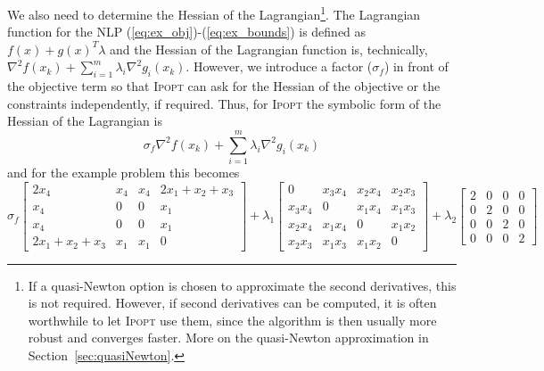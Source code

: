 \documentclass[10pt]{article}
\newcommand{\Ipopt}{\textsc{Ipopt}\xspace}
\begin{document}
We also need to determine the Hessian of the Lagrangian\footnote{If a
  quasi-Newton option is chosen to approximate the second derivatives,
  this is not required.  However, if second derivatives can be
  computed, it is often worthwhile to let \Ipopt use them, since the
  algorithm is then usually more robust and converges faster.  More on
  the quasi-Newton approximation in Section~\ref{sec:quasiNewton}.}.
The Lagrangian function for the NLP
(\ref{eq:ex_obj})-(\ref{eq:ex_bounds}) is defined as $f(x) + g(x)^T
\lambda$ and the Hessian of the Lagrangian function is, technically, $
\nabla^2 f(x_k) + \sum_{i=1}^m\lambda_i\nabla^2 g_i(x_k)$.  However,
we introduce a factor ($\sigma_f$) in front of the objective term
so that \Ipopt can ask for the Hessian of the objective or the
constraints independently, if required.
%
Thus, for \Ipopt the symbolic form of the Hessian of the
Lagrangian is
\begin{equation}\label{eq:IpoptLAG}
\sigma_f \nabla^2 f(x_k) + \sum_{i=1}^m\lambda_i\nabla^2 g_i(x_k)
\end{equation}
and for the example problem this becomes
\[%
\sigma_f \left[
\begin{array}{cccc}
2 x_4           & x_4           & x_4           & 2 x_1 + x_2 + x_3     \\
x_4             & 0             & 0             & x_1                   \\
x_4             & 0             & 0             & x_1                   \\
2 x_1+x_2+x_3   & x_1           & x_1           & 0
\end{array}
\right]
+
\lambda_1
\left[
\begin{array}{cccc}
0               & x_3 x_4       & x_2 x_4       & x_2 x_3       \\
x_3 x_4         & 0             & x_1 x_4       & x_1 x_3       \\
x_2 x_4         & x_1 x_4       & 0             & x_1 x_2       \\
x_2 x_3         & x_1 x_3       & x_1 x_2       & 0 
\end{array}
\right]
+
\lambda_2
\left[
\begin{array}{cccc}
2       & 0     & 0     & 0     \\
0       & 2     & 0     & 0     \\
0       & 0     & 2     & 0     \\
0       & 0     & 0     & 2
\end{array}
\right]
\]%
\end{document}
